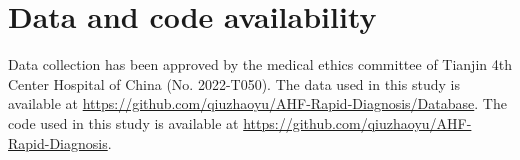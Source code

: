 \section{Data and code availability}\label{Data and code availability}
Data collection has been approved by the medical ethics committee of Tianjin 4th Center Hospital of China (No. 2022-T050). The data used in this study is available at \href{https://github.com/qiuzhaoyu/AHF-Rapid-Diagnosis/Database}{https://github.com/qiuzhaoyu/AHF-Rapid-Diagnosis/Database}. The code used in this study is available at \href{https://github.com/qiuzhaoyu/AHF-Rapid-Diagnosis}{https://github.com/qiuzhaoyu/AHF-Rapid-Diagnosis}.